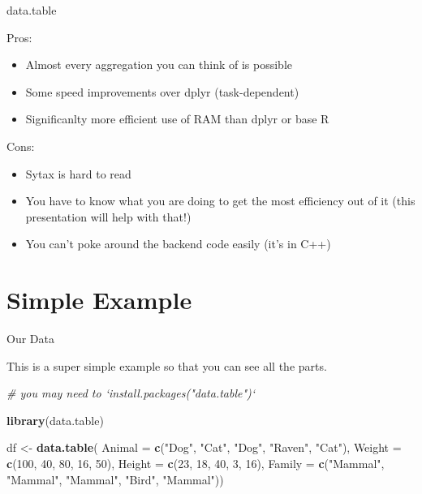\documentclass[ignorenonframetext,]{beamer}
\newenvironment{Shaded}{\begin{snugshade}}{\end{snugshade}}
\newcommand{\CommentTok}[1]{\textcolor[rgb]{0.56,0.35,0.01}{\textit{#1}}}
\newcommand{\DataTypeTok}[1]{\textcolor[rgb]{0.13,0.29,0.53}{#1}}
\newcommand{\DecValTok}[1]{\textcolor[rgb]{0.00,0.00,0.81}{#1}}
\newcommand{\KeywordTok}[1]{\textcolor[rgb]{0.13,0.29,0.53}{\textbf{#1}}}
\newcommand{\NormalTok}[1]{#1}
\newcommand{\StringTok}[1]{\textcolor[rgb]{0.31,0.60,0.02}{#1}}
\providecommand{\tightlist}{%
  \setlength{\itemsep}{0pt}\setlength{\parskip}{0pt}}
\begin{document}
\begin{frame}{data.table}
\protect\hypertarget{data.table}{}

Pros:

\begin{itemize}
\tightlist
\item
  Almost every aggregation you can think of is possible
\item
  Some speed improvements over dplyr (task-dependent)
\item
  Significanlty more efficient use of RAM than dplyr or base R
\end{itemize}

Cons:

\begin{itemize}
\tightlist
\item
  Sytax is hard to read
\item
  You have to know what you are doing to get the most efficiency out of
  it (this presentation will help with that!)
\item
  You can't poke around the backend code easily (it's in C++)
\end{itemize}

\end{frame}

\hypertarget{simple-example}{%
\section{Simple Example}\label{simple-example}}

\begin{frame}[fragile]{Our Data}
\protect\hypertarget{our-data}{}

This is a super simple example so that you can see all the parts.

\begin{Shaded}
\begin{Highlighting}[]
\CommentTok{# you may need to `install.packages("data.table")`}

\KeywordTok{library}\NormalTok{(data.table)}

\NormalTok{df <-}
\StringTok{  }\KeywordTok{data.table}\NormalTok{(}
    \DataTypeTok{Animal =} \KeywordTok{c}\NormalTok{(}\StringTok{"Dog"}\NormalTok{, }\StringTok{"Cat"}\NormalTok{, }\StringTok{"Dog"}\NormalTok{,}
               \StringTok{"Raven"}\NormalTok{, }\StringTok{"Cat"}\NormalTok{), }
    \DataTypeTok{Weight =} \KeywordTok{c}\NormalTok{(}\DecValTok{100}\NormalTok{, }\DecValTok{40}\NormalTok{, }\DecValTok{80}\NormalTok{, }\DecValTok{16}\NormalTok{, }\DecValTok{50}\NormalTok{),}
    \DataTypeTok{Height =} \KeywordTok{c}\NormalTok{(}\DecValTok{23}\NormalTok{, }\DecValTok{18}\NormalTok{, }\DecValTok{40}\NormalTok{, }\DecValTok{3}\NormalTok{, }\DecValTok{16}\NormalTok{),}
    \DataTypeTok{Family =} \KeywordTok{c}\NormalTok{(}\StringTok{"Mammal"}\NormalTok{, }\StringTok{"Mammal"}\NormalTok{, }\StringTok{"Mammal"}\NormalTok{,}
               \StringTok{"Bird"}\NormalTok{, }\StringTok{"Mammal"}\NormalTok{))}
\end{Highlighting}
\end{Shaded}

\end{frame}
\end{document}
